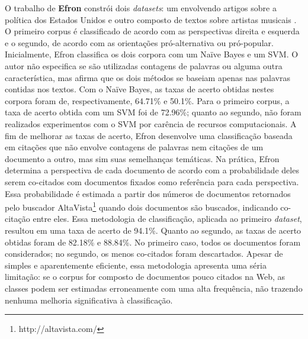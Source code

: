 O trabalho de \textbf{Efron} constrói dois \emph{datasets}: um envolvendo artigos sobre a política dos Estados Unidos e outro composto de textos sobre artistas musicais \cite{efron}. O primeiro corpus é classificado de acordo com as perspectivas direita e esquerda e o segundo, de acordo com as orientações pró-alternativa ou pró-popular. Inicialmente, Efron classifica os dois corpora com um Naïve Bayes e um SVM. O autor não especifica se são utilizadas contagens de palavras ou alguma outra característica, mas afirma que os dois métodos se baseiam apenas nas palavras contidas nos textos. Com o Naïve Bayes, as taxas de acerto obtidas nestes corpora foram de, respectivamente, 64.71\% e 50.1\%. Para o primeiro corpus, a taxa de acerto obtida com um SVM foi de 72.96\%; quanto ao segundo, não foram realizados experimentos com o SVM por carência de recursos computacionais. A fim de melhorar as taxas de acerto,  Efron desenvolve uma classificação baseada em citações que não envolve contagens de palavras nem citações de um documento a outro, mas sim suas semelhanças temáticas. Na prática, Efron determina a perspectiva de cada documento de acordo com a probabilidade deles serem co-citados com  documentos fixados como referência para cada perspectiva. Essa probabilidade é estimada a partir dos números de documentos retornados pelo buscador AltaVista\footnote{http://altavista.com/} quando dois documentos são buscados, indicando co-citação entre eles. Essa metodologia de classificação, aplicada ao primeiro \emph{dataset}, resultou em uma taxa de acerto de 94.1\%. Quanto ao segundo, as taxas de acerto obtidas foram de 82.18\% e 88.84\%. No primeiro caso, todos os documentos foram considerados; no segundo, os menos co-citados foram descartados. Apesar de simples e aparentemente eficiente, essa metodologia apresenta uma séria limitação: se o corpus for composto de documentos pouco citados na Web, as classes podem ser estimadas erroneamente com uma alta frequência, não trazendo nenhuma melhoria significativa à classificação.

